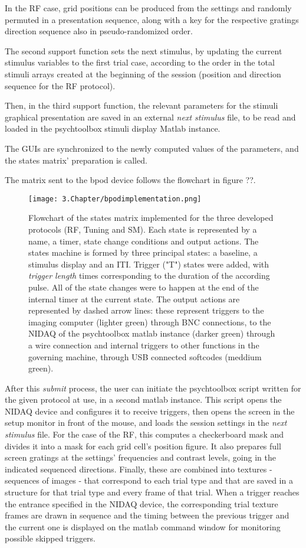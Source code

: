 In the RF case, grid positions can be produced from the settings and randomly permuted in a presentation sequence, along with a key for the respective gratings direction sequence also in pseudo-randomized order.

The second support function sets the next stimulus, by updating the current stimulus variables to the first trial case, according to the order in the total stimuli arrays created at the beginning of the session (position and direction sequence for the RF protocol).

Then, in the third support function, the relevant parameters for the stimuli graphical presentation are saved in an external \textit{next stimulus} file, to be read and loaded in the psychtoolbox stimuli display Matlab instance.

The GUIs are synchronized to the newly computed values of the parameters, and the states matrix' preparation is called.

The matrix sent to the bpod device follows the flowchart in figure ??.

\begin{figure}[H]
	\centering
		\texttt{[image: 3.Chapter/bpodimplementation.png]}
	\caption[c1]{Flowchart of the states matrix implemented for the three developed protocols (RF, Tuning and SM). Each state is represented by a name, a timer, state change conditions and output actions. The states machine is formed by three principal states: a baseline, a stimulus display and an ITI. Trigger ("T") states were added, with \textit{trigger length} times corresponding to the duration of the according pulse. All of the state changes were to happen at the end of the internal timer at the current state. The output actions are represented by dashed arrow lines: these represent triggers to the imaging computer (lighter green) through BNC connections, to the NIDAQ of the psychtoolbox matlab instance (darker green) through a wire connection and internal triggers to other functions in the governing machine, through USB connected softcodes (meddium green).}
	\label{fig:bpodimplementation}
\end{figure}

After this \textit{submit} process, the user can initiate the psychtoolbox script written for the given protocol at use, in a second matlab instance. This script opens the NIDAQ device and configures it to receive triggers, then opens the screen in the setup monitor in front of the mouse, and loads the session settings in the \textit{next stimulus} file. For the case of the RF, this computes a checkerboard mask and divides it into a mask for each grid cell's position figure. It also prepares full screen gratings at the settings' frequencies and contrast levels, going in the indicated sequenced directions. Finally, these are combined into textures - sequences of images - that correspond to each trial type and that are saved in a structure for that trial type and every frame of that trial.
When a trigger reaches the entrance specified in the NIDAQ device, the corresponding trial texture frames are drawn in sequence and the timing between the previous trigger and the current one is displayed on the matlab command window for monitoring possible skipped triggers.

